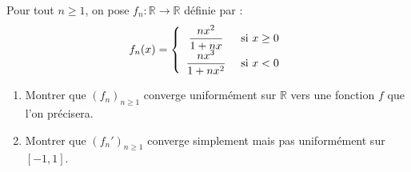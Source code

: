 \documentclass[a4paper,10pt]{report}
\begin{document}
\begin{Exercice}{} Pour tout $n \geq 1$, on pose $f_n : \mathbb{R} \rightarrow \mathbb{R}$ définie par :
$$ f_n(x)= \left\lbrace \begin{array}{cl}
\dfrac{nx^2}{1+nx} & \hbox{ si } x \geq 0 \\
\dfrac{nx^3}{1+nx^2} & \hbox{ si } x < 0 \\
\end{array}\right.$$
\begin{enumerate}
\item Montrer que $(f_n)_{n \geq 1}$ converge uniformément sur $\mathbb{R}$ vers une fonction $f$ que l'on précisera.
\item Montrer que $(f_n')_{n \geq 1}$ converge simplement mais pas uniformément sur $[-1,1]$.
\end{enumerate}
\end{Exercice}
\end{document}
